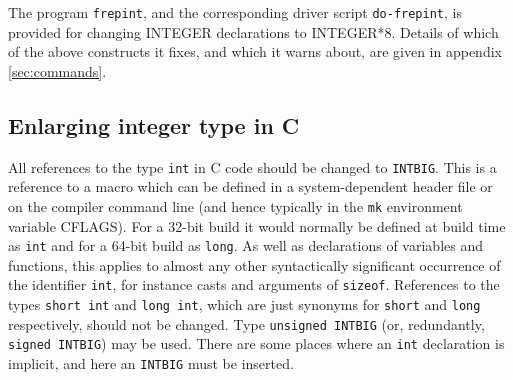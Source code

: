 \documentclass[twoside,11pt]{article}
\newcommand{\htmlref}[2]{#1}
\newcommand{\latexhtml}[2]{#1}
\renewcommand{\_}{\texttt{\symbol{95}}}
\newcommand{\xroutine}[1]{\htmlref{{\tt #1}}{#1}}
\newcommand{\xdofilter}[1]{\htmlref{{\tt do-#1}}{do-xxx}}
\newcommand{\file}[1]{{\tt #1}}
\newcommand{\cc}[1]{{\tt #1}}
\begin{document}
The program \xroutine{frepint}, and the corresponding driver script
\xdofilter{frepint}, is provided for changing
INTEGER declarations to INTEGER*8.
Details of which of the above constructs it fixes, and which it
warns about, are given in
\latexhtml{appendix \ref{sec:commands}}{\htmlref{the appendix}{frepint}}.


\subsection{Enlarging integer type in C\label{sec:cint}}

All references to the type \cc{int} in C code should be changed to
\cc{INT\_BIG}.  This is a reference to a macro which can be defined
in a system-dependent header file or on the compiler command line
(and hence typically in the \file{mk} environment variable CFLAGS).
For a 32-bit build it would normally be defined at build time as
\cc{int} and for a 64-bit build as \cc{long}.
As well as declarations of variables and functions, this applies
to almost any other syntactically significant occurrence of the
identifier \cc{int}, for instance casts and arguments of \cc{sizeof}.
References to the types \cc{short~int} and \cc{long~int},
which are just synonyms for \cc{short} and \cc{long} respectively,
should not be changed.  Type \cc{unsigned~INT\_BIG}
(or, redundantly, \cc{signed~INT\_BIG}) may be used.
There are some places where an \cc{int} declaration is implicit,
and here an \cc{INT\_BIG} must be inserted.
\end{document}
